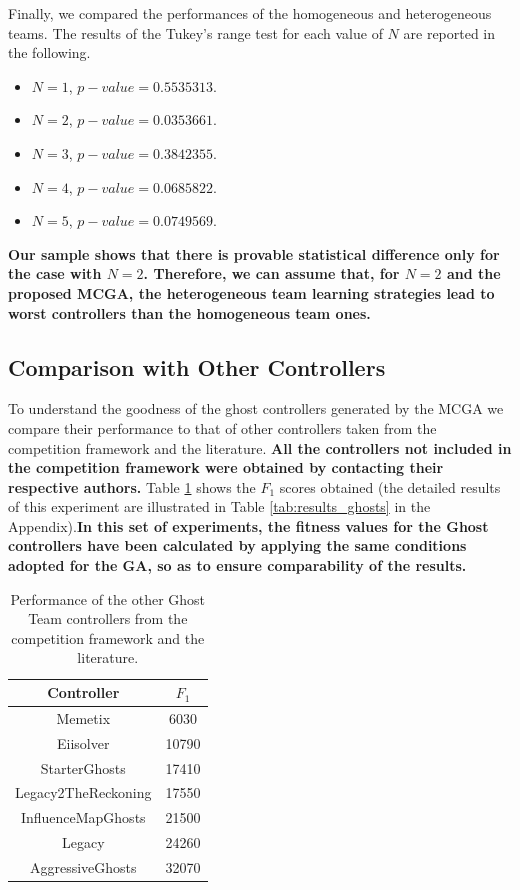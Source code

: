 \documentclass[journal]{IEEEtran}
\begin{document}
Finally, we compared the performances of the homogeneous and heterogeneous teams. The results of the Tukey's range test for each value of $N$ are reported in the following.

\begin{itemize}
\item $N=1$, $p-value = 0.5535313$.
\item $N=2$, $p-value = 0.0353661$.
\item $N=3$, $p-value = 0.3842355$.
\item $N=4$, $p-value = 0.0685822$.
\item $N=5$, $p-value = 0.0749569$.
\end{itemize}

\textbf{Our sample shows that there is provable statistical difference only for the case with $N=2$. Therefore, we can assume that, for $N=2$ and the proposed MCGA, the heterogeneous team learning strategies lead to worst controllers than the homogeneous team ones.}

\subsection{Comparison with Other Controllers}
To understand the goodness of the ghost controllers generated by the MCGA we compare their performance to that of other controllers taken from the competition framework and the literature. \textbf{All the controllers not included in the competition framework were obtained by contacting their respective authors.} Table \ref{tab:summary_others} shows the $F_1$ scores obtained (the detailed results of this experiment are illustrated in Table \ref{tab:results_ghosts} in the Appendix).\textbf{In this set of experiments, the fitness values for the Ghost controllers have been calculated by applying the same conditions adopted for the GA, so as to ensure comparability of the results.}

\begin{table} [!t]
\caption{Performance of the other Ghost Team controllers from the competition framework and the literature.}
\label{tab:summary_others}
\centering
\begin{tabular}{|c|c|}
\hline 
Controller & $F_1$ \\
\hline
Memetix\cite{Tose2012} & 6030 \\
\hline
Eiisolver \cite{Verhaard} & 10790 \\
\hline
StarterGhosts & 17410 \\
\hline
Legacy2TheReckoning & 17550 \\
\hline
InfluenceMapGhosts \cite{Svensson2012} & 21500 \\
\hline
Legacy & 24260 \\
\hline
AggressiveGhosts & 32070 \\
\hline
\end{tabular}
\end{table}
\end{document}
